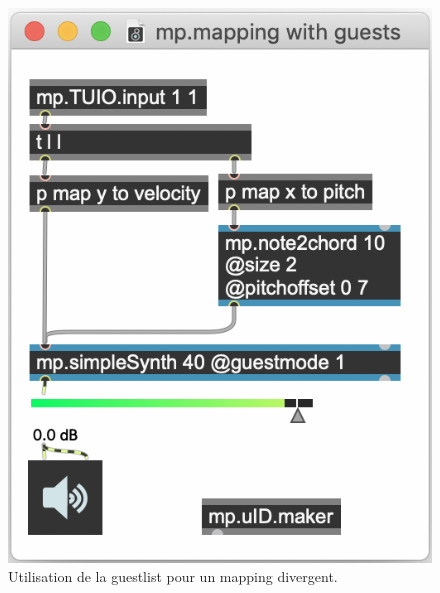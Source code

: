 \begin{figure}[!htbp]
	\captionsetup{format=plain}%
	\centering
	\begin{minipage}[t]{0.38\textwidth}
		\includegraphics[width=\linewidth]{gfx/04_algorithms/MP-mappingGuest.png}
		\caption[Exemple de patch MP : Utilisation de la guestlist pour un mapping divergent]{Utilisation de la guestlist pour un mapping divergent.}
		\label{fig:algorithms:MP-mappingDivergent}
	\end{minipage}
	\hspace{.01\linewidth}
	\begin{minipage}[t]{0.58\textwidth}

\end{minipage}
\end{figure}
